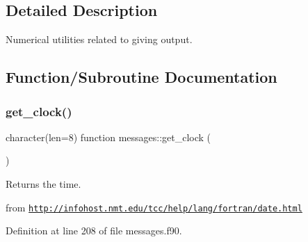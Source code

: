 \subsection{Detailed Description}
Numerical utilities related to giving output. 

\subsection{Function/\+Subroutine Documentation}
\mbox{\label{namespacemessages_a61fd0b51b5e37d58fdc993c01792a3fd}} 
\subsubsection{\texorpdfstring{get\+\_\+clock()}{get\_clock()}}
{\footnotesize\ttfamily character(len=8) function messages\+::get\+\_\+clock (\begin{DoxyParamCaption}{ }\end{DoxyParamCaption})}



Returns the time. 

from \href{http://infohost.nmt.edu/tcc/help/lang/fortran/date.html}{\tt http\+://infohost.\+nmt.\+edu/tcc/help/lang/fortran/date.\+html} 

Definition at line 208 of file messages.\+f90.


